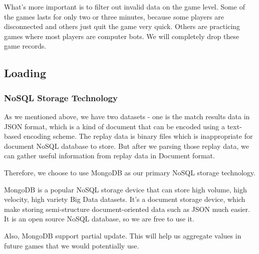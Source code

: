 \documentclass{article}
\begin{document}
What's more important is to filter out invalid data on the game level. Some of the games lasts for only two or three minutes, because some players are disconnected and others just quit the game very quick. Others are practicing games where most players are computer bots. We will completely drop these game records.









\subsection{Loading}

\subsubsection{NoSQL Storage Technology}

As we mentioned above, we have two datasets - one is the match results data in JSON format, which is a kind of document that can be encoded using a text-based encoding scheme.
The replay data is binary files which is inappropriate for document NoSQL database to store.
But after we parsing those replay data, we can gather useful information from replay data in Document format.

Therefore, we choose to use MongoDB as our primary NoSQL storage technology.

MongoDB is a popular NoSQL storage device that can store high volume, high velocity, high variety Big Data datasets.
It's a document storage device, which make storing semi-structure document-oriented data such as JSON much easier.
It is an open source NoSQL database, so we are free to use it.

Also, MongoDB support partial update.
This will help us aggregate values in future games that we would potentially use.
\end{document}
